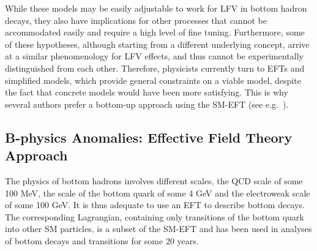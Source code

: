{While these models may be easily adjustable to work for LFV in 
bottom hadron decays, they also have implications for other processes
that cannot be accommodated easily and require a high level of fine
tuning. Furthermore, some of these hypotheses, although starting from
a different underlying concept, arrive at a similar phenomenology for 
LFV effects, and thus cannot be experimentally distinguished from each other. Therefore, physicists currently turn to EFTs and simplified models, which
provide general constraints on a viable model, %
despite the fact that concrete models would have been more satisfying.
This is why several authors prefer a bottom-up approach using the
SM-EFT (see e.g.~\citet{Buttazzo:2017ixm}).

\subsection{B-physics Anomalies: Effective Field Theory Approach}\label{sec:Bphysics}

The physics of bottom hadrons involves different scales, the QCD scale of
some 100 MeV, the scale of the bottom quark of some 4 GeV and the
electroweak scale of some 100 GeV. It is thus adequate to use an EFT to
describe bottom decays.  The corresponding Lagrangian, containing only
transitions of the bottom quark into other SM particles, is a subset
of the SM-EFT and has been used in analyses of bottom decays and
transitions for some 20 years.

}
